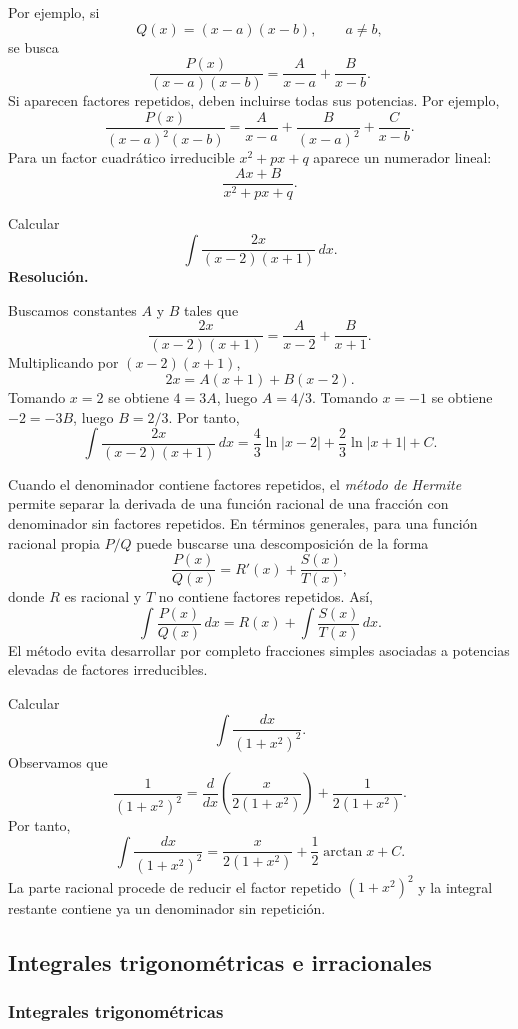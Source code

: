 Por ejemplo, si
\[
Q(x)=(x-a)(x-b),\qquad a\neq b,
\]
se busca
\[
\frac{P(x)}{(x-a)(x-b)}
=
\frac{A}{x-a}+\frac{B}{x-b}.
\]
Si aparecen factores repetidos, deben incluirse todas sus potencias. Por ejemplo,
\[
\frac{P(x)}{(x-a)^2(x-b)}
=
\frac{A}{x-a}+\frac{B}{(x-a)^2}+\frac{C}{x-b}.
\]
Para un factor cuadrático irreducible $x^2+px+q$ aparece un numerador lineal:
\[
\frac{Ax+B}{x^2+px+q}.
\]

\begin{solvedexercise}
Calcular
\[
\int\frac{2x}{(x-2)(x+1)}\,dx.
\]
\tcblower
\textbf{Resolución.}\par\smallskip
Buscamos constantes $A$ y $B$ tales que
\[
\frac{2x}{(x-2)(x+1)}
=
\frac{A}{x-2}+\frac{B}{x+1}.
\]
Multiplicando por $(x-2)(x+1)$,
\[
2x=A(x+1)+B(x-2).
\]
Tomando $x=2$ se obtiene $4=3A$, luego $A=4/3$. Tomando $x=-1$ se obtiene $-2=-3B$, luego $B=2/3$. Por tanto,
\[
\int\frac{2x}{(x-2)(x+1)}\,dx
=
\frac43\ln|x-2|+\frac23\ln|x+1|+C.
\]
\end{solvedexercise}

Cuando el denominador contiene factores repetidos, el \emph{método de Hermite} permite separar la derivada de una función racional de una fracción con denominador sin factores repetidos. En términos generales, para una función racional propia $P/Q$ puede buscarse una descomposición de la forma
\[
\frac{P(x)}{Q(x)}
=
R'(x)+\frac{S(x)}{T(x)},
\]
donde $R$ es racional y $T$ no contiene factores repetidos. Así,
\[
\int\frac{P(x)}{Q(x)}\,dx
=
R(x)+\int\frac{S(x)}{T(x)}\,dx.
\]
El método evita desarrollar por completo fracciones simples asociadas a potencias elevadas de factores irreducibles.

\begin{example}
Calcular
\[
\int\frac{dx}{(1+x^2)^2}.
\]
Observamos que
\[
\frac{1}{(1+x^2)^2}
=
\frac{d}{dx}\left(\frac{x}{2(1+x^2)}\right)
+
\frac{1}{2(1+x^2)}.
\]
Por tanto,
\[
\int\frac{dx}{(1+x^2)^2}
=
\frac{x}{2(1+x^2)}+\frac12\arctan x+C.
\]
La parte racional procede de reducir el factor repetido $(1+x^2)^2$ y la integral restante contiene ya un denominador sin repetición.
\end{example}

\subsection{Integrales trigonométricas e irracionales}

\subsubsection{Integrales trigonométricas}

